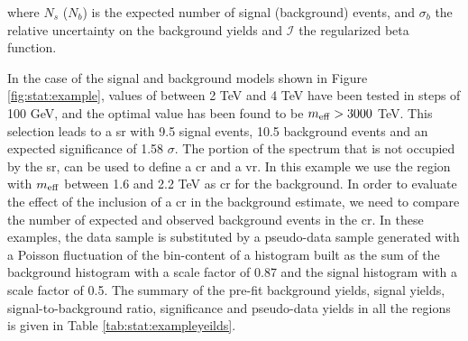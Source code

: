 \noindent where $N_s$ ($N_b$) is the expected number of signal (background) events, and $\sigma_b$ the relative uncertainty on the background yields and $\mathcal{I}$ the regularized beta function. 

In the case of the signal and background models shown in Figure \ref{fig:stat:example}, values of \meff between 2 TeV and 4 TeV have been tested in steps of 100 GeV, and the optimal value has been found to be $m_{\mathrm{eff}} > 3000$ TeV. This selection leads to a \gls{sr} with  9.5 signal events, 10.5 background events and an expected significance of 1.58 $\sigma$. 
The portion of the \meff spectrum that is not occupied by the \gls{sr}, can be used to define a \gls{cr} and a \gls{vr}.
In this example we use the region with $m_{\mathrm{eff}}$ between 1.6 and 2.2 TeV as \gls{cr} for the background. 
In order to evaluate the effect of the inclusion of a \gls{cr} in the background estimate, we need to compare the number of expected and observed background events in the \gls{cr}. 
In these examples, the data sample is substituted by a pseudo-data sample generated with a Poisson fluctuation 
of the bin-content of a histogram built as the sum of the background histogram with a scale factor of 0.87 and the signal histogram with a scale factor of 0.5. The summary of the pre-fit background yields, signal yields, signal-to-background ratio, significance and pseudo-data yields in all the regions is given in Table \ref{tab:stat:exampleyeilds}.


